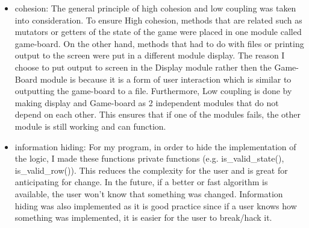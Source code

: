 \documentclass[12pt]{article}
\begin{document}
\begin{itemize}
\item cohesion: The general principle of high cohesion and low coupling was taken into consideration. To ensure High cohesion, methods that are related such as mutators or getters of the state of the game were placed in one module called game-board. On the other hand, methods that had to do with files or printing output to the screen were put in a different module display. The reason I choose to put output to screen in the Display module rather then the Game-Board module is because it is a form of user interaction which is similar to outputting the game-board to a file. Furthermore, Low coupling is done by making display and Game-board as 2 independent modules that do not depend on each other. This ensures that if one of the modules fails, the other module is still working and can function.

\item information hiding: For my program, in order to hide the implementation of the logic, I made these functions private functions (e.g. is\_valid\_state(), is\_valid\_row()). This reduces the complexity for the user and is great for anticipating for change. In the future, if a better or fast algorithm is available, the user won't know that something was changed. Information hiding was also implemented as it is good practice since if a user knows how something was implemented, it is easier for the user to break/hack it.



\end{itemize}
\end{document}
